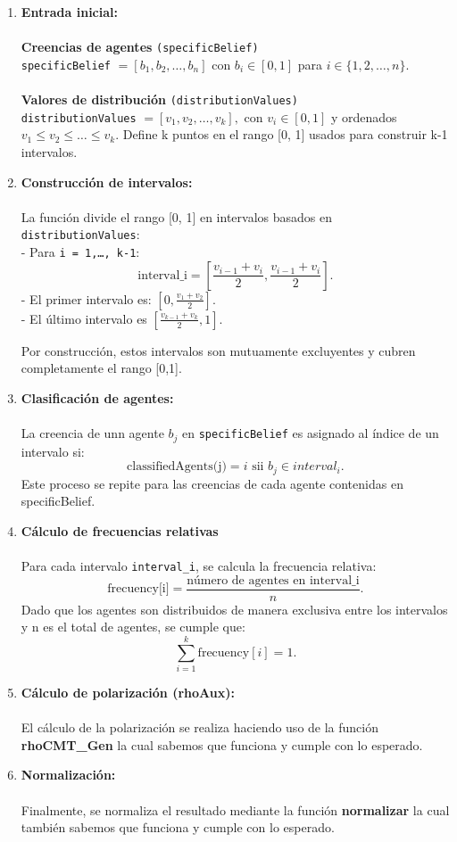 \documentclass{article}
\begin{document}
    \begin{enumerate}
      \item \textbf{Entrada inicial:}\\\\
      \textbf{Creencias de agentes} \texttt{(specificBelief)}\\
      \texttt{specificBelief} $= [b_1,b_2,\dots,b_n]$ con $b_i \in [0, 1]$ para $i \in \{1, 2,\dots, n\}.$\\\\
      \textbf{Valores de distribución} \texttt{(distributionValues)}\\
      \texttt{distributionValues} $= [v_1,v_2,\dots,v_k] ,$ con $v_i \in [0, 1]$ y ordenados $v_1 \leq v_2 \leq \dots \leq v_k$.
      Define k puntos en el rango [0, 1] usados para construir k-1 intervalos.
      \item \textbf{Construcción de intervalos:}\\\\
      La función divide el rango [0, 1] en intervalos basados en \texttt{distributionValues}:\\
      -  Para \texttt{i = 1,\dots, k-1}:
        \[
        \text{interval\_i} = [\frac{v_{i-1} +v_i}{2}, \frac{v_{i-1} +v_i}{2}].
        \]  
      - El primer intervalo es: $\left[0, \frac{v_1 + v_2}{2}\right]$. \\
      - El último intervalo es $\left[\frac{v_{k-1} +v_k}{2}, 1\right]$.
      
      Por construcción, estos intervalos son mutuamente excluyentes y cubren completamente el rango [0,1].
      \item \textbf{Clasificación de agentes:}\\\\
      La creencia de unn agente $b_j$ en \texttt{specificBelief} es asignado al índice de un intervalo si:
      \[
      \text{classifiedAgents(j)} = i \text{ sii } b_j \in interval_i.
      \]  
      Este proceso se repite para las creencias de cada agente contenidas en specificBelief.
      \item \textbf{Cálculo de frecuencias relativas}\\\\
      Para cada intervalo \texttt{interval\_i}, se calcula la frecuencia relativa:
        \[
        \text{frecuency[i]} = \frac{\text{número de agentes en interval\_i}}{n}.
        \]  
      Dado que los agentes son distribuidos de manera exclusiva entre los intervalos y n es el total de agentes, se cumple que:
        \[
        \sum_{i=1}^{k} \text{frecuency}[i] = 1.
        \]  
      \item \textbf{Cálculo de polarización (rhoAux):}\\\\
      El cálculo de la polarización se realiza haciendo uso de la función \textbf{rhoCMT\_Gen} la cual sabemos que funciona y cumple con lo esperado.
      \item \textbf{Normalización:}\\\\
      Finalmente, se normaliza el resultado mediante la función \textbf{normalizar} la cual también sabemos que funciona y cumple con lo esperado.
    \end{enumerate}
  
\end{document}
